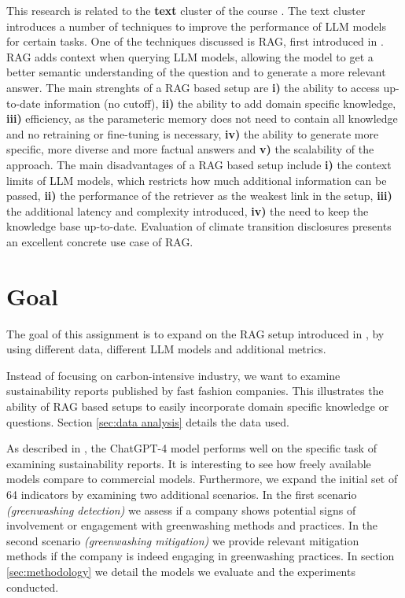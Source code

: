 \documentclass[]{article}
\begin{document}
This research is related to the \textbf{text} cluster of the course \cite{ou}.
The text cluster introduces a number of techniques to improve the performance of LLM models for certain tasks.
One of the techniques discussed is RAG, first introduced in \cite{rag}.
RAG adds context when querying LLM models, allowing the model to get a better semantic understanding of the question and to generate a more relevant answer.
The main strenghts of a RAG based setup are \textbf{i)} the ability to access up-to-date information (no cutoff), \textbf{ii)} the ability to add domain specific knowledge, \textbf{iii)} efficiency, as the parameteric memory does not need to contain all knowledge and no retraining or fine-tuning is necessary, \textbf{iv)} the ability to generate more specific, more diverse and more factual answers and \textbf{v)} the scalability of the approach.
The main disadvantages of a RAG based setup include \textbf{i)} the context limits of LLM models, which restricts how much additional information can be passed, \textbf{ii)} the performance of the retriever as the weakest link in the setup, \textbf{iii)} the additional latency and complexity introduced, \textbf{iv)} the need to keep the knowledge base up-to-date.
Evaluation of climate transition disclosures presents an excellent concrete use case of RAG.

\section{Goal} \label{sec:goal}

The goal of this assignment is to expand on the RAG setup introduced in \cite{durability}, by using different data, different LLM models and additional metrics.

Instead of focusing on carbon-intensive industry, we want to examine sustainability reports published by fast fashion companies.
This illustrates the ability of RAG based setups to easily incorporate domain specific knowledge or questions.
Section \ref{sec:data analysis} details the data used.

As described in \cite{durability}, the ChatGPT-4 model performs well on the specific task of examining sustainability reports.
It is interesting to see how freely available models compare to commercial models.
Furthermore, we expand the initial set of 64 indicators by examining two additional scenarios.
In the first scenario \textit{(greenwashing detection)} we assess if a company shows potential signs of involvement or engagement with greenwashing methods and practices.
In the second scenario \textit{(greenwashing mitigation)} we provide relevant mitigation methods if the company is indeed engaging in greenwashing practices.
In section \ref{sec:methodology} we detail the models we evaluate and the experiments conducted.
\end{document}
